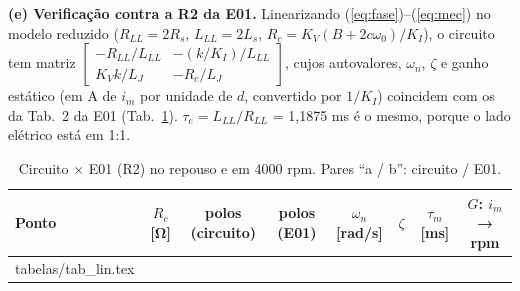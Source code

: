 \documentclass[10pt,a4paper]{article}
\begin{document}
\textbf{(e) Verificação contra a R2 da E01.} Linearizando (\ref{eq:fase})–(\ref{eq:mec}) no modelo reduzido ($R_{LL}=2R_s$, $L_{LL}=2L_s$, $R_c=K_V(B+2c\omega_0)/K_I$), o circuito tem matriz $\begin{bmatrix}-R_{LL}/L_{LL}&-(k/K_I)/L_{LL}\\ K_Vk/L_J&-R_c/L_J\end{bmatrix}$, cujos autovalores, $\omega_n$, $\zeta$ e ganho estático (em A de $i_m$ por unidade de $d$, convertido por $1/K_I$) coincidem com os da Tab.~2 da E01 (Tab.~\ref{tab:lin}). $\tau_e=L_{LL}/R_{LL}$ = 1,1875 ms é o mesmo, porque o lado elétrico está em 1:1.
\begin{table}[!htbp]\centering\footnotesize\setlength{\tabcolsep}{4pt}
\caption{Circuito × E01 (R2) no repouso e em 4000 rpm. Pares ``a / b'': circuito / E01.}\label{tab:lin}
\begin{tabular}{lccccccc}\toprule
Ponto & $R_c$ [Ω] & polos (circuito) & polos (E01) & $\omega_n$ [rad/s] & $\zeta$ & $\tau_m$ [ms] & $G$: $i_m$ → rpm\\\midrule
{} tabelas/tab_lin.tex \bottomrule
\end{tabular}
\end{table}
\end{document}
